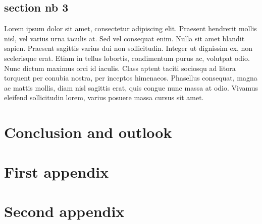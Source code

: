 \documentclass[a4paper, 11pt]{report}
\begin{document}
\section{section nb 3}

Lorem ipsum dolor sit amet, consectetur adipiscing elit.
Praesent hendrerit mollis nisl, vel varius urna iaculis at.
Sed vel consequat enim.
Nulla sit amet blandit sapien.
Praesent sagittis varius dui non sollicitudin.
Integer ut dignissim ex, non scelerisque erat.
Etiam in tellus lobortis, condimentum purus ac, volutpat odio.
Nunc dictum maximus orci id iaculis.
Class aptent taciti sociosqu ad litora torquent per conubia nostra, 
per inceptos himenaeos.
Phasellus consequat, magna ac mattis mollis, diam nisl sagittis erat, 
quis congue nunc massa at odio.
Vivamus eleifend sollicitudin lorem, varius posuere massa cursus sit 
amet.


\chapter*{Conclusion and outlook}


\newpage                 %



\appendix


\chapter{First appendix}

\chapter{Second appendix}
\end{document}
